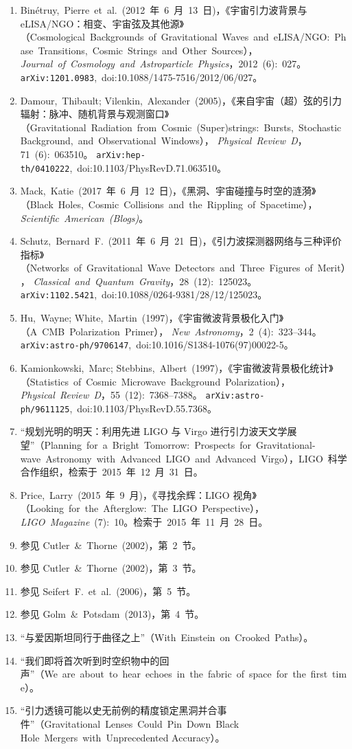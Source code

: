 \begin{enumerate}
  \item Binétruy,~Pierre~et~al.~(2012~年~6~月~13~日)，《宇宙引力波背景与 eLISA/NGO：相变、宇宙弦及其他源》（Cosmological~Backgrounds~of~Gravitational~Waves~and~eLISA/NGO:~Phase~Transitions,~Cosmic~Strings~and~Other~Sources），%
        \textit{Journal~of~Cosmology~and~Astroparticle~Physics}，2012~(6):~027。%
        \texttt{arXiv:1201.0983},~doi:10.1088/1475-7516/2012/06/027。
  \item Damour,~Thibault; Vilenkin,~Alexander~(2005)，《来自宇宙（超）弦的引力辐射：脉冲、随机背景与观测窗口》（Gravitational~Radiation~from~Cosmic~(Super)strings:~Bursts,~Stochastic~Background,~and~Observational~Windows），%
        \textit{Physical~Review~D}，71~(6):~063510。%
        \texttt{arXiv:hep-th/0410222},~doi:10.1103/PhysRevD.71.063510。
  \item Mack,~Katie~(2017~年~6~月~12~日)，《黑洞、宇宙碰撞与时空的涟漪》（Black~Holes,~Cosmic~Collisions~and~the~Rippling~of~Spacetime），%
        \textit{Scientific~American~(Blogs)}。
  \item Schutz,~Bernard~F.~(2011~年~6~月~21~日)，《引力波探测器网络与三种评价指标》（Networks~of~Gravitational~Wave~Detectors~and~Three~Figures~of~Merit），%
        \textit{Classical~and~Quantum~Gravity}，28~(12):~125023。%
        \texttt{arXiv:1102.5421},~doi:10.1088/0264-9381/28/12/125023。
  \item Hu,~Wayne; White,~Martin~(1997)，《宇宙微波背景极化入门》（A~CMB~Polarization~Primer），%
        \textit{New~Astronomy}，2~(4):~323–344。%
        \texttt{arXiv:astro-ph/9706147},~doi:10.1016/S1384-1076(97)00022-5。
  \item Kamionkowski,~Marc; Stebbins,~Albert~(1997)，《宇宙微波背景极化统计》（Statistics~of~Cosmic~Microwave~Background~Polarization），%
        \textit{Physical~Review~D}，55~(12):~7368–7388。%
        \texttt{arXiv:astro-ph/9611125},~doi:10.1103/PhysRevD.55.7368。
  \item “规划光明的明天：利用先进 LIGO 与 Virgo 进行引力波天文学展望”（Planning~for~a~Bright~Tomorrow:~Prospects~for~Gravitational-wave~Astronomy~with~Advanced~LIGO~and~Advanced~Virgo），LIGO~科学合作组织，检索于~2015~年~12~月~31~日。
  \item Price,~Larry~(2015~年~9~月)，《寻找余辉：LIGO 视角》（Looking~for~the~Afterglow:~The~LIGO~Perspective），%
        \textit{LIGO~Magazine}~(7):~10。检索于~2015~年~11~月~28~日。
  \item 参见 Cutler~\&~Thorne~(2002)，第~2~节。
  \item 参见 Cutler~\&~Thorne~(2002)，第~3~节。
  \item 参见 Seifert~F.~et~al.~(2006)，第~5~节。
  \item 参见 Golm~\&~Potsdam~(2013)，第~4~节。
  \item “与爱因斯坦同行于曲径之上”（With~Einstein~on~Crooked~Paths）。
  \item “我们即将首次听到时空织物中的回声”（We~are~about~to~hear~echoes~in~the~fabric~of~space~for~the~first~time）。
  \item “引力透镜可能以史无前例的精度锁定黑洞并合事件”（Gravitational~Lenses~Could~Pin~Down~Black Hole~Mergers~with~Unprecedented Accuracy）。
\end{enumerate}
